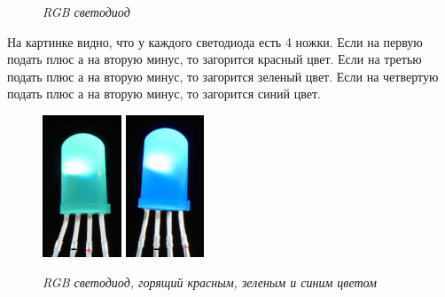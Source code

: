 \documentclass[a4paper, 12pt]{article}
\newcommand{\image}[3]{
	\begin{figure}[ht]
		\center{\texttt{[image: img/\#1]} }
		\caption{\textit{#3}}\end{figure}
}
\begin{document}
\image{Светодиод.png}{140}{RGB светодиод}

\newpage
На картинке видно, что у каждого светодиода есть 4 ножки. Если на первую подать
плюс а на вторую минус, то загорится красный цвет. Если на третью подать
плюс а на вторую минус, то загорится зеленый цвет. Если на четвертую подать
плюс а на вторую минус, то загорится синий цвет.

\begin{figure}[ht]
	\includegraphics[height=160px]{img/Светодиод зеленый.jpg}
	\includegraphics[height=160px]{img/Светодиод синий.jpg}
	\caption{\textit{RGB светодиод, горящий красным, зеленым и синим цветом}}
\end{figure}
\end{document}
